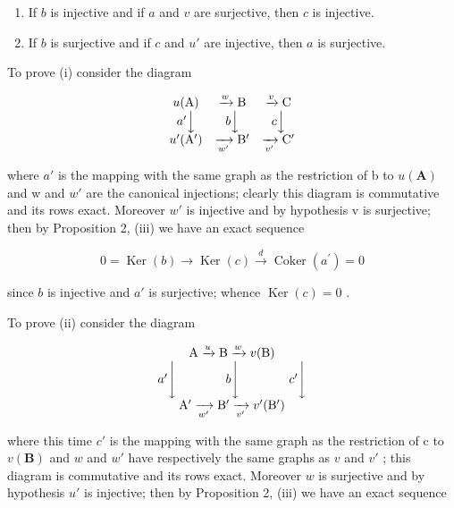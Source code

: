 \begin{enumerate}
\def\labelenumi{(\roman{enumi})}
\item
  If \(b\) is injective and if \(a\) and \(v\) are surjective, then \(c\) is injective.
\item
  If \(b\) is surjective and if \(c\) and \(u'\) are injective, then \(a\) is surjective.
\end{enumerate}

To prove (i) consider the diagram

\[
\begin{array}{c c c} u (\mathrm{A}) & \xrightarrow {w} \mathrm{B} & \xrightarrow {v} \mathrm{C} \\ a ^ {\prime} \Big \downarrow & b \Big \downarrow & c \Big \downarrow \\ u ^ {\prime} (\mathrm{A} ^ {\prime}) & \xrightarrow [ w ^ {\prime} ]{} \mathrm{B} ^ {\prime} & \xrightarrow [ v ^ {\prime} ]{} \mathrm{C} ^ {\prime} \end{array}
\]

where \(a'\) is the mapping with the same graph as the restriction of b to \(u(\mathbf{A})\) and w and \(w'\) are the canonical injections; clearly this diagram is commutative and its rows exact. Moreover \(w'\) is injective and by hypothesis v is surjective; then by Proposition 2, (iii) we have an exact sequence

\[
0 = \operatorname{Ker} (b) \longrightarrow \operatorname{Ker} (c) \stackrel {d} {\longrightarrow} \operatorname{Coker} (a ^ {\prime}) = 0
\]

since \(b\) is injective and \(a'\) is surjective; whence \(\operatorname{Ker}(c) = 0\) .

To prove (ii) consider the diagram

\[
\begin{array}{c} \mathrm{A} \xrightarrow {u} \mathrm{B} \xrightarrow {w} v (\mathrm{B}) \\ a ^ {\prime} \Biggl \downarrow \qquad \qquad b \Biggl \downarrow \qquad \qquad c ^ {\prime} \Biggl \downarrow \\ \mathrm{A} ^ {\prime} \xrightarrow [ w ^ {\prime} ]{} \mathrm{B} ^ {\prime} \xrightarrow [ v ^ {\prime} ]{} v ^ {\prime} (\mathrm{B} ^ {\prime}) \end{array}
\]

where this time \(c'\) is the mapping with the same graph as the restriction of c to \(v(\mathbf{B})\) and \(w\) and \(w'\) have respectively the same graphs as \(v\) and \(v'\) ; this diagram is commutative and its rows exact. Moreover \(w\) is surjective and by hypothesis \(u'\) is injective; then by Proposition 2, (iii) we have an exact sequence

